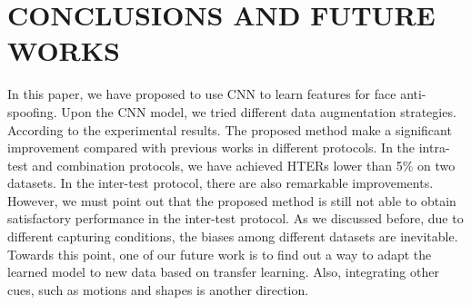 \documentclass[letterpaper, 10 pt, conference]{ieeeconf}
\begin{document}
\section{CONCLUSIONS AND FUTURE WORKS}

In this paper, we have proposed to use CNN to learn features for face anti-spoofing. Upon the CNN model, we tried different data augmentation strategies. According to the experimental results. The proposed method make a significant improvement compared with previous works in different protocols. In the intra-test and combination protocols, we have achieved HTERs lower than 5\% on two datasets. In the inter-test protocol, there are also remarkable improvements. However, we must point out that the proposed method is still not able to obtain satisfactory performance in the inter-test protocol. As we discussed before, due to different capturing conditions, the biases among different datasets are inevitable. Towards this point, one of our future work is to find out a way to adapt the learned model to new data based on transfer learning. Also, integrating other cues, such as motions and shapes is another direction.



\end{document}
